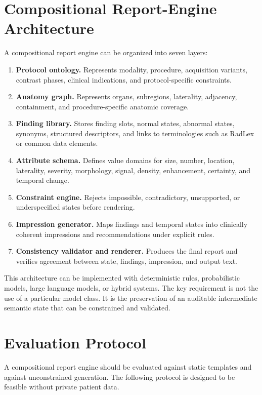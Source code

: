 \documentclass[11pt]{article}
\begin{document}
\section{Compositional Report-Engine Architecture}

A compositional report engine can be organized into seven layers:
\begin{enumerate}[leftmargin=*]
    \item \textbf{Protocol ontology.} Represents modality, procedure, acquisition variants, contrast phases, clinical indications, and protocol-specific constraints.
    \item \textbf{Anatomy graph.} Represents organs, subregions, laterality, adjacency, containment, and procedure-specific anatomic coverage.
    \item \textbf{Finding library.} Stores finding slots, normal states, abnormal states, synonyms, structured descriptors, and links to terminologies such as RadLex or common data elements.
    \item \textbf{Attribute schema.} Defines value domains for size, number, location, laterality, severity, morphology, signal, density, enhancement, certainty, and temporal change.
    \item \textbf{Constraint engine.} Rejects impossible, contradictory, unsupported, or underspecified states before rendering.
    \item \textbf{Impression generator.} Maps findings and temporal states into clinically coherent impressions and recommendations under explicit rules.
    \item \textbf{Consistency validator and renderer.} Produces the final report and verifies agreement between state, findings, impression, and output text.
\end{enumerate}

This architecture can be implemented with deterministic rules, probabilistic models, large language models, or hybrid systems. The key requirement is not the use of a particular model class. It is the preservation of an auditable intermediate semantic state that can be constrained and validated.

\section{Evaluation Protocol}\label{sec:eval}

A compositional report engine should be evaluated against static templates and against unconstrained generation. The following protocol is designed to be feasible without private patient data.
\end{document}
